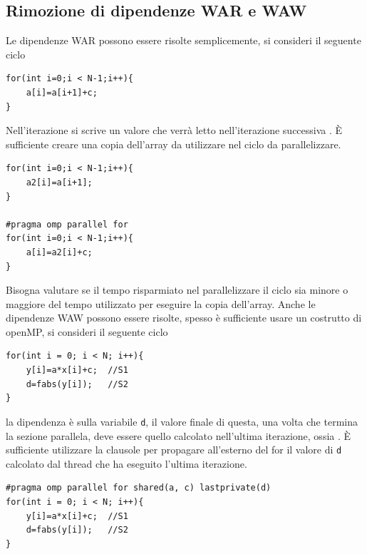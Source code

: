 \documentclass[10pt, letterpaper]{report}
\begin{document}
\subsection{Rimozione di dipendenze WAR e WAW}
Le dipendenze WAR possono essere risolte semplicemente, si consideri il seguente ciclo
\begin{lstlisting}[style=CStyle]
for(int i=0;i < N-1;i++){
    a[i]=a[i+1]+c;
}
\end{lstlisting}
Nell'iterazione  si scrive un valore che verrà letto nell'iterazione successiva . È sufficiente creare una copia dell'array  da utilizzare nel ciclo da parallelizzare.
\begin{lstlisting}[style=CStyle]
for(int i=0;i < N-1;i++){
    a2[i]=a[i+1];
}

#pragma omp parallel for 
for(int i=0;i < N-1;i++){
    a[i]=a2[i]+c;
}
\end{lstlisting}
Bisogna valutare se il tempo risparmiato nel parallelizzare il ciclo sia minore o maggiore del tempo utilizzato per eseguire la copia dell'array.\acc 
Anche le dipendenze WAW possono essere risolte, spesso è sufficiente usare un costrutto di openMP, si consideri il seguente ciclo
\begin{lstlisting}[style=CStyle]
for(int i = 0; i < N; i++){
    y[i]=a*x[i]+c;  //S1 
    d=fabs(y[i]);   //S2
}
\end{lstlisting}
la dipendenza è sulla variabile \texttt{d}, il valore finale di questa, una volta che termina la sezione  parallela, deve essere quello calcolato nell'ultima iterazione, ossia . È sufficiente utilizzare la clausole  per propagare all'esterno del for il valore di \texttt{d} calcolato dal thread che ha eseguito l'ultima iterazione.
\begin{lstlisting}[style=CStyle]
#pragma omp parallel for shared(a, c) lastprivate(d)
for(int i = 0; i < N; i++){
    y[i]=a*x[i]+c;  //S1 
    d=fabs(y[i]);   //S2
}
\end{lstlisting}
\end{document}
